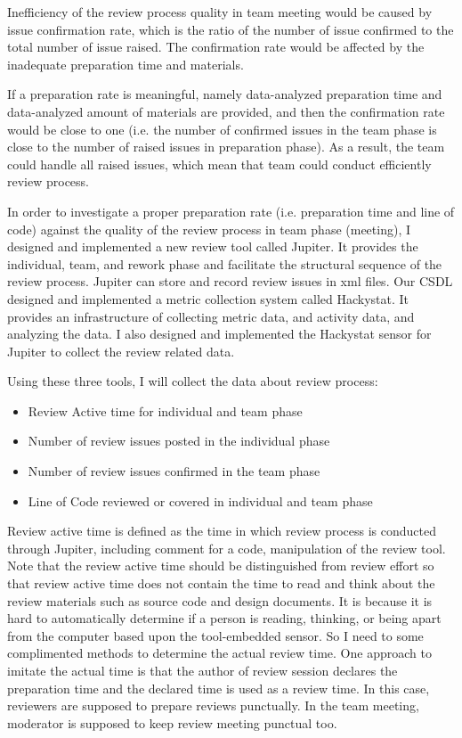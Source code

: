 \documentclass[11pt,twocolumn]{article}
\begin{document}
Inefficiency of the review process quality in team meeting would be
caused by issue confirmation rate, which is the ratio of the number
of issue confirmed to the total number of issue raised. The
confirmation rate would be affected by the inadequate preparation
time and materials.

If a preparation rate is meaningful, namely data-analyzed
preparation time and data-analyzed amount of materials are provided,
and then the confirmation rate would be close to one (i.e. the
number of confirmed issues in the team phase is close to the number
of raised issues in preparation phase). As a result, the team could
handle all raised issues, which mean that team could conduct
efficiently review process.

\label{sec:experimentalResearchEvaluation}


In order to investigate a proper preparation rate (i.e. preparation
time and line of code) against the quality of the review process in
team phase (meeting), I designed and implemented a new review tool
called Jupiter. It provides the individual, team, and rework phase
and facilitate the structural sequence of the review process.
Jupiter can store and record review issues in xml files. Our CSDL
designed and implemented a metric collection system called
Hackystat. It provides an infrastructure of collecting metric data,
and activity data, and analyzing the data. I also designed and
implemented the Hackystat sensor for Jupiter to collect the review
related data.


Using these three tools, I will collect the data about review
process:
\begin{itemize}
    \item Review Active time for individual and team phase
    \item Number of review issues posted in the individual phase
    \item Number of review issues confirmed in the team phase
    \item Line of Code reviewed or covered in individual and team phase
\end{itemize}
Review active time is defined as the time in which review process is
conducted through Jupiter, including comment for a code,
manipulation of the review tool. Note that the review active time
should be distinguished from review effort so that review active
time does not contain the time to read and think about the review
materials such as source code and design documents. It is because it
is hard to automatically determine if a person is reading, thinking,
or being apart from the computer based upon the tool-embedded
sensor. So I need to some complimented methods to determine the
actual review time. One approach to imitate the actual time is that
the author of review session declares the preparation time and the
declared time is used as a review time. In this case, reviewers are
supposed to prepare reviews punctually. In the team meeting,
moderator is supposed to keep review meeting punctual too.
\end{document}
